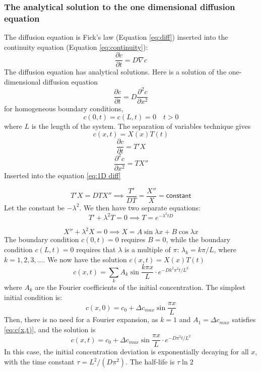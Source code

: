 \documentclass{article}
\begin{document}
\subsubsection{The analytical solution to the one dimensional diffusion equation}\label{analytical solution}
The diffusion equation is Fick's law (Equation \ref{eq:diff}) inserted into the continuity equation (Equation \ref{eq:continuity}): 
\begin{equation}
\frac{\partial c}{\partial t} = D\nabla c
\end{equation}
The diffusion equation has analytical solutions. Here is a solution of the one-dimensional diffusion equation 
\begin{equation}\label{eq:1D diff}
\frac{\partial c}{\partial t} = D\frac{\partial^2 c}{\partial x^2}
\end{equation}
for homogeneous boundary conditions, 
$$c(0,t) = c(L,t)=0 \quad t>0$$ where $L$ is the length of the system. The separation of variables technique gives 
\begin{equation*}
c(x,t) = X(x)T(t)
\end{equation*}
\begin{equation*}
\frac{\partial c}{\partial t} = T'X
\end{equation*}
\begin{equation*}
\frac{\partial^2 c}{\partial x^2} = TX''
\end{equation*}
Inserted into the equation \ref{eq:1D diff}

\begin{equation*}
T'X  = DTX''\implies \frac{T'}{DT} = \frac{X''}{X} =\mathsf{ constant}
\end{equation*}
Let the constant be $-\lambda ^2$. We then have two separate equations:
\begin{equation*}
T' + \lambda^2 T = 0 \implies T=e^{-\lambda^2 tD}
\end{equation*}

\begin{equation*}
X'' + \lambda^2X = 0 \implies X=A \sin \lambda x + B\cos \lambda x
\end{equation*}
The boundary condition $c(0,t) = 0$ requires $B=0$, while the boundary condition $c(L,t)=0$ requires that $\lambda$ is a multiple of $\pi$: $\lambda_k = k\pi /L$, where $k = 1,2,3,...$. 
We now have the solution $c(x,t)=X(x)T(t)$
\begin{equation}\label{eq:c(x,t)}
c(x,t) = \sum_k A_k \sin \frac{k \pi x}{L}\cdot e^{-Dk^2\pi^2 t /L^2}
\end{equation}
where $A_k$ are the Fourier coefficients of the initial concentration.
The simplest initial condition is: 
$$c(x,0) =c_0 +  \Delta c_{max}\sin{\frac{\pi x}{L}}$$
Then, there is no need for a Fourier expansion, as $k=1$ and $A_1 = \Delta c_{max}$ satisfies \ref{eq:c(x,t)}, and the solution is
\begin{equation*}
c(x,t) =c_0 + \Delta c_{max} \sin \frac{ \pi x}{L}\cdot e^{-D\pi^2 t /L^2}
\end{equation*}
In this case, the initial concentration deviation is exponentially  decaying for all $x$, with the time constant $\tau = L^2/(D\pi^2)$. The half-life is $\tau \ln 2$
\end{document}
